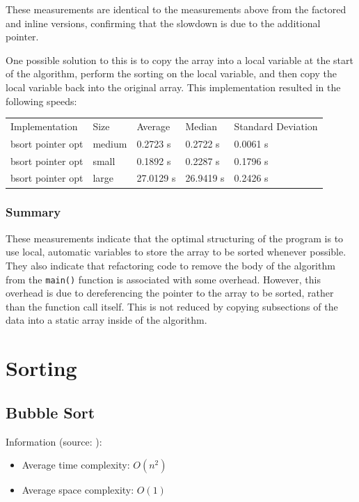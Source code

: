 \documentclass{article}
\begin{document}
These measurements are identical to the measurements above from the
factored and inline versions, confirming that the slowdown is due to
the additional pointer. 

One possible solution to this is to copy the array into a local
variable at the start of the algorithm, perform the sorting on the
local variable, and then copy the local variable back into the
original array. This implementation resulted in the following speeds:

\begin{center}
\begin{tabular}{lllll}
 Implementation     &  Size    &  Average    &  Median     &  Standard Deviation  \\
 bsort pointer opt  &  medium  &  0.2723 s   &  0.2722 s   &  0.0061 s            \\
 bsort pointer opt  &  small   &  0.1892 s   &  0.2287 s   &  0.1796 s            \\
 bsort pointer opt  &  large   &  27.0129 s  &  26.9419 s  &  0.2426 s            \\
\end{tabular}
\end{center}

\subsubsection{Summary}
These measurements indicate that the optimal structuring of the
program is to use local, automatic variables to store the array to be
sorted whenever possible. They also indicate that refactoring code to remove the body of
the algorithm from the \texttt{main()} function is associated with
some overhead. However, this overhead is due to dereferencing the
pointer to the array to be sorted, rather than the function call
itself. This is not reduced by copying subsections of the data into a
static array inside of the algorithm.

\section{Sorting}
\subsection{Bubble Sort}
Information (source: \cite{Algos}):
\begin{itemize}
\item Average time complexity: $O(n^2)$ 
\item Average space complexity: $O(1)$ 
\end{itemize}
\end{document}
